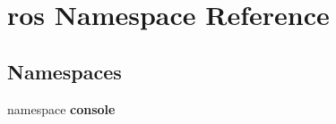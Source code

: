 \section{ros Namespace Reference}
\label{namespaceros}
\subsection*{Namespaces}
\begin{DoxyCompactItemize}
\item 
namespace {\bf console}
\end{DoxyCompactItemize}
